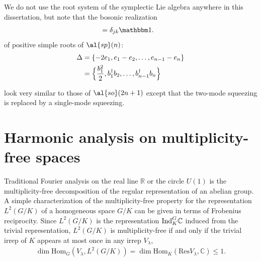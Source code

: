 We do not use the root system of the symplectic Lie algebra anywhere in this dissertation, but note that the bosonic realization
\begin{align}
	[b_j,b_k\dgg] &= \delta_{jk}\id.
\end{align}
of positive simple roots of $\al{sp}(n)$:
\begin{align}
	\Delta &= \{-2e_1, e_1 - e_2, \dots, e_{n-1} - e_n \} \\
	&= \Bigl\{ \frac{b_1^2}{2} ,b_1\dgg b_2, \dots, b_{n-1}\dgg b_n \Bigr\}
\end{align}
	\begin{center}
	\end{center}
look very similar to those of $\al{so}(2n+1)$ except that the two-mode squeezing is replaced by a single-mode squeezing.

\section{Harmonic analysis on multiplicity-free spaces}\label{ch2:gelfand}

Traditional Fourier analysis on the real line $\mathbb{R}$ or the circle $U(1)$ is the multiplicity-free decomposition of the regular representation of an abelian group. A simple characterization of the multiplicity-free property for the representation $L^2(G/K)$ of a homogeneous space $G/K$ can be given in terms of Frobenius reciprocity. Since $L^2(G/K)$ is the representation $\ind{\mathbb{C}}{K}{G}$ induced from the trivial representation, $L^2(G/K)$ is multiplicity-free if and only if the trivial irrep of $K$ appears at most once in any irrep $V_{\lambda}$,
\begin{align}
\dim \text{Hom}_G ( V_{\lambda}, L^2(G/K) ) = \dim \text{Hom}_K (\text{Res} V_{\lambda}, \mathbb{C}) \le 1.
\end{align}

